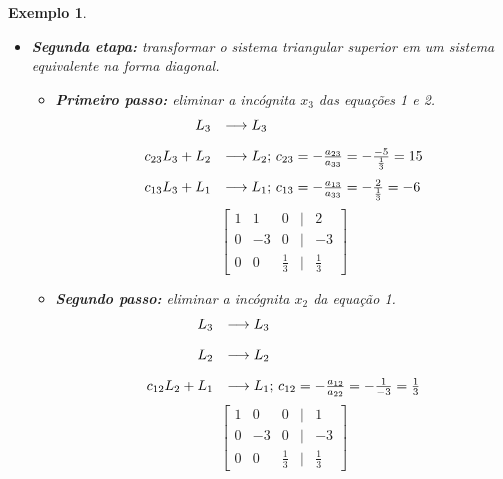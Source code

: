 \documentclass[
	12pt,				%
	openright,			%
	twoside,			%
	a4paper,			%
	english,			%
	french,				%
	brazil,				%
	sumario=tradicional
]{abntex2}
\newtheorem{example}{Exemplo}
\numberwithin{example}{chapter}
\numberwithin{remark}{chapter}
\numberwithin{definition}{chapter}
\numberwithin{figure}{chapter}
\begin{document}
\begin{example}
\begin{itemize}
        \item \textbf{Segunda etapa: } transformar o sistema triangular superior em um sistema equivalente na forma diagonal.

        \begin{itemize}
            \item \textbf{Primeiro passo: } eliminar a incógnita $x_3$ das equações 1 e 2.
            $$
            	\begin{array}{r l}
	                L_3 & \longrightarrow L_3\\[10pt]
                	c_{23}L_3 + L_2 & \longrightarrow L_2\text{; } c_{23}=-\frac{a_{23}}{a_{33}}=-\frac{-5}{\frac{1}{3}}=15\\[10pt]
            	    c_{13}L_3+L_1 & \longrightarrow L_1\text{; } c_{13}=-\frac{a_{13}}{a_{33}}=-\frac{2}{\frac{1}{3}}=-6
                \end{array}
            $$
            $$
	            \begin{bmatrix}
                	1 & 1 & 0 &|& 2\\
	                0 & -3 & 0 &|& -3\\
        	        0 & 0 & \frac{1}{3} &|& \frac{1}{3}
        	    \end{bmatrix}
	        $$

            \item \textbf{Segundo passo: } eliminar a incógnita $x_2$ da equação 1.
            $$
            	\begin{array}{r l}
	                L_3 & \longrightarrow L_3\\[10pt]
                	L_2 & \longrightarrow L_2\\[10pt]
            	    c_{12}L_2+L_1 & \longrightarrow L_1\text{; } c_{12}=-\frac{a_{12}}{a_{22}}=-\frac{1}{-3}=\frac{1}{3}
                \end{array}
            $$
            $$
	            \begin{bmatrix}
                	1 & 0 & 0 &|& 1\\
	                0 & -3 & 0 &|& -3\\
        	        0 & 0 & \frac{1}{3} &|& \frac{1}{3}
        	    \end{bmatrix}
	        $$
        \end{itemize}


\end{itemize}
\end{example}
\end{document}
